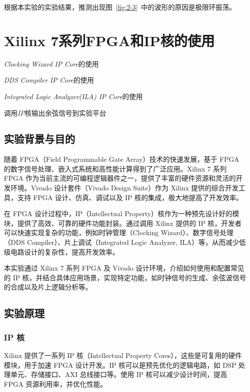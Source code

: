 \documentclass[lang=cn,newtx,10pt,scheme=chinese]{elegantbook}
\begin{document}
根据本实验的实验结果，推测出现图~\ref{fig:2-3}~中的波形的原因是极限环振荡。

\chapter{Xilinx 7系列FPGA和IP核的使用}
\begin{introduction}
  \item \textit{Clocking Wizard IP Core}的使用
  \item \textit{DDS Compiler IP Core}的使用
  \item \textit{Integrated Logic Analyzer(ILA) IP Core}的使用
  \item 调用\textit{IP}核输出余弦信号到实验平台
\end{introduction}
\section{实验背景与目的}
随着 FPGA（Field Programmable Gate Array）技术的快速发展，基于 FPGA 的数字信号处理、嵌入式系统和高性能计算得到了广泛应用。Xilinx 7 系列 FPGA 作为当前主流的可编程逻辑器件之一，提供了丰富的硬件资源和灵活的开发环境。Vivado 设计套件（Vivado Design Suite）作为 Xilinx 提供的综合开发工具，支持 FPGA 设计、仿真、调试以及 IP 核的集成，极大地提高了开发效率。

在 FPGA 设计过程中，IP（Intellectual Property）核作为一种预先设计好的模块，提供了高效、可靠的硬件功能封装。通过调用 Xilinx 提供的 IP 核，开发者可以快速实现复杂的功能，例如时钟管理（Clocking Wizard）、数字信号处理（DDS Compiler）、片上调试（Integrated Logic Analyzer, ILA）等，从而减少低级电路设计的复杂性，提高开发效率。

本实验通过 Xilinx 7 系列 FPGA 及 Vivado 设计环境，介绍如何使用和配置常见的 IP 核，并结合具体应用场景，实现特定功能，如时钟信号的生成、余弦波信号的合成以及片上逻辑分析等。

\section{实验原理}
\subsection{IP 核}
\begin{definition}[IP核]
  Xilinx 提供了一系列 IP 核（Intellectual Property Cores），这些是可复用的硬件模块，用于加速 FPGA 设计开发。IP 核可以是预先优化的逻辑电路，如 DSP 处理单元、存储接口、AXI 总线接口等。使用 IP 核可以减少设计时间，提高 FPGA 资源利用率，并优化性能。
\end{definition}
\end{document}
